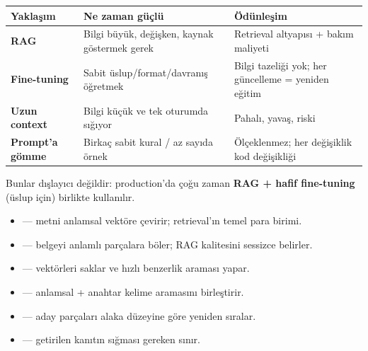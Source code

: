 \vspace{2pt}
\begin{tabularx}{\linewidth}{@{}>{\raggedright\arraybackslash}p{26mm} L L@{}}
\toprule
{\sffamily\bfseries\small Yaklaşım} &
{\sffamily\bfseries\small Ne zaman güçlü} &
{\sffamily\bfseries\small Ödünleşim} \\
\midrule
\textbf{RAG} & Bilgi büyük, değişken, kaynak göstermek gerek &
Retrieval altyapısı + bakım maliyeti \\
\addlinespace[3pt]
\textbf{Fine-tuning} & Sabit üslup/format/davranış öğretmek &
Bilgi tazeliği yok; her güncelleme = yeniden eğitim \\
\addlinespace[3pt]
\textbf{Uzun context} & Bilgi küçük ve tek oturumda sığıyor &
Pahalı, yavaş,  riski \\
\addlinespace[3pt]
\textbf{Prompt'a gömme} & Birkaç sabit kural / az sayıda örnek &
Ölçeklenmez; her değişiklik kod değişikliği \\
\bottomrule
\end{tabularx}

\vspace{4pt}
Bunlar dışlayıcı değildir: production'da çoğu zaman \textbf{RAG + hafif
fine-tuning} (üslup için) birlikte kullanılır.

\begin{itemize}
  \item {} --- metni anlamsal vektöre çevirir; retrieval'ın temel para birimi.
  \item {} --- belgeyi anlamlı parçalara böler; RAG kalitesini sessizce belirler.
  \item {} --- vektörleri saklar ve hızlı benzerlik araması yapar.
  \item {} --- anlamsal + anahtar kelime aramasını birleştirir.
  \item {} --- aday parçaları alaka düzeyine göre yeniden sıralar.
  \item {} --- getirilen kanıtın sığması gereken sınır.
\end{itemize}

